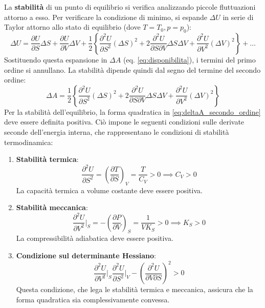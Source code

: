 La \textbf{stabilità} di un punto di equilibrio si verifica analizzando piccole fluttuazioni attorno a esso. Per verificare la condizione di minimo, si espande $\Delta U$ in serie di Taylor attorno allo stato di equilibrio (dove $T=T_0, p=p_0$):
\begin{equation*}
    \Delta U=\frac{\partial U}{\partial S}\Delta S+\frac{\partial U}{\partial V}\Delta V+\frac{1}{2}\left\{\frac{\partial^{2}U}{\partial S^{2}}(\Delta S)^{2}+2\frac{\partial^{2}U}{\partial S\partial V}\Delta S\Delta V+\frac{\partial^{2}U}{\partial V^{2}}(\Delta V)^{2}\right\}+\dots
\end{equation*}
Sostituendo questa espansione in $\Delta A$ (eq. \eqref{eq:disponibilita}), i termini del primo ordine si annullano. La stabilità dipende quindi dal segno del termine del secondo ordine:
\begin{equation}
    \Delta A=\frac{1}{2}\left\{\frac{\partial^{2}U}{\partial S^{2}}(\Delta S)^{2}+2\frac{\partial^{2}U}{\partial S\partial V}\Delta S\Delta V+\frac{\partial^{2}U}{\partial V^{2}}(\Delta V)^{2}\right\}
    \label{eq:deltaA_secondo_ordine}
\end{equation}
Per la stabilità dell'equilibrio, la forma quadratica in \eqref{eq:deltaA_secondo_ordine} deve essere definita positiva. Ciò impone le seguenti condizioni sulle derivate seconde dell'energia interna, che rappresentano le condizioni di stabilità termodinamica:
\begin{enumerate}
    \item \textbf{Stabilità termica}:
    \begin{equation}
        \frac{\partial^{2}U}{\partial S^{2}} = \left(\frac{\partial T}{\partial S}\right)_V = \frac{T}{C_V} > 0 \implies C_V > 0
    \end{equation}
    La capacità termica a volume costante deve essere positiva.

    \item \textbf{Stabilità meccanica}:
    \begin{equation}
        \frac{\partial^{2}U}{\partial V^{2}}\bigg|_{S} = -\left(\frac{\partial P}{\partial V}\right)_S = \frac{1}{V K_S} > 0 \implies K_S > 0
    \end{equation}
    La compressibilità adiabatica deve essere positiva.

    \item \textbf{Condizione sul determinante Hessiano}:
    \begin{equation}
        \frac{\partial^{2}U}{\partial V^{2}}\bigg|_{S}\frac{\partial^{2}U}{\partial S^{2}}\bigg|_{V}-\left(\frac{\partial^{2}U}{\partial V\partial S}\right)^{2}>0
    \end{equation}
    Questa condizione, che lega le stabilità termica e meccanica, assicura che la forma quadratica sia complessivamente convessa.
\end{enumerate}


